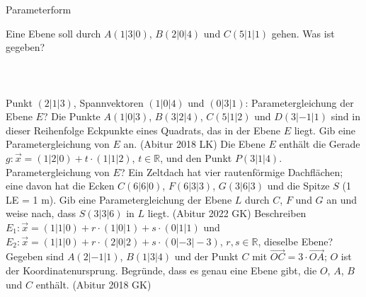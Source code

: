 \setcounter{aufgabe}{9}

\begin{aufgabe}{Parameterform}
\begin{teile}
\teil Eine Ebene soll durch $A(1 | 3 | 0)$, $B(2 | 0 | 4)$ und $C(5 | 1 | 1)$ gehen. Was ist gegeben? \\  \\  \\  \\ 
\teil Punkt $(2 | 1 | 3)$, Spannvektoren $(1 | 0 | 4)$ und $(0 | 3 | 1)$: Parametergleichung der Ebene $E$?
\teil Die Punkte $A(1 | 0 | 3)$, $B(3 | 2 | 4)$, $C(5 | 1 | 2)$ und $D(3 | -1 | 1)$ sind in dieser Reihenfolge Eckpunkte eines Quadrats, das in der Ebene $E$ liegt. Gib eine Parametergleichung von $E$ an. \hfill (Abitur 2018 LK)
\teil Die Ebene $E$ enthält die Gerade $g\colon \vec x = (1 | 2 | 0) + t \cdot (1 | 1 | 2)$, $t \in \mathbb{R}$, und den Punkt $P(3 | 1 | 4)$. Parametergleichung von $E$?
\teil Ein Zeltdach hat vier rautenförmige Dachflächen; eine davon hat die Ecken $C(6 | 6 | 0)$, $F(6 | 3 | 3)$, $G(3 | 6 | 3)$ und die Spitze $S$ (1 LE = 1 m). Gib eine Parametergleichung der Ebene $L$ durch $C$, $F$ und $G$ an und weise nach, dass $S(3 | 3 | 6)$ in $L$ liegt. \hfill (Abitur 2022 GK)
\teil Beschreiben $E_1\colon \vec x = (1 | 1 | 0) + r \cdot (1 | 0 | 1) + s \cdot (0 | 1 | 1)$ und $E_2\colon \vec x = (1 | 1 | 0) + r \cdot (2 | 0 | 2) + s \cdot (0 | -3 | -3)$, $r, s \in \mathbb{R}$, dieselbe Ebene?
\teil Gegeben sind $A(2 | -1 | 1)$, $B(1 | 3 | 4)$ und der Punkt $C$ mit $\overrightarrow{OC} = 3 \cdot \overrightarrow{OA}$; $O$ ist der Koordinatenursprung. Begründe, dass es genau eine Ebene gibt, die $O$, $A$, $B$ und $C$ enthält. \hfill (Abitur 2018 GK)
\end{teile}
\end{aufgabe}

